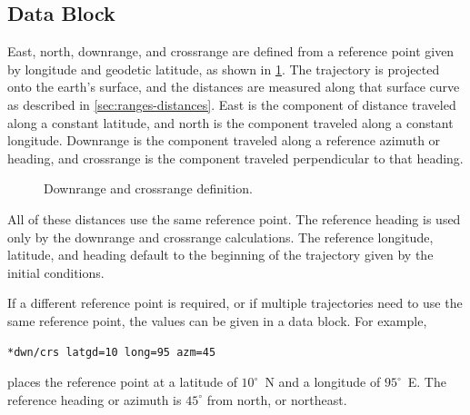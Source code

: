 \subsection{ Data Block}\label{sec:block-dwn-crs}

East, north, downrange, and crossrange are defined from a reference point given by
longitude and geodetic latitude, as shown in
\cref{fig:downrange-crossrange-definition}. The trajectory is projected onto the
earth's surface, and the distances are measured along that surface curve as described
in \cref{sec:ranges-distances}. East is the component of distance traveled along a
constant latitude, and north is the component traveled along a constant longitude.
Downrange is the component traveled along a reference azimuth or heading, and
crossrange is the component traveled perpendicular to that heading.

\begin{figure}[htbp]
  \centering
  
  \caption{Downrange and crossrange definition.}
  \label{fig:downrange-crossrange-definition}
\end{figure}

All of these distances use the same reference point. The reference heading is used
only by the downrange and crossrange calculations. The reference longitude,
latitude, and heading default to the beginning of the trajectory given by the initial
conditions.

If a different reference point is required, or if multiple trajectories need to use the
same reference point, the values can be given in a  data
block. For example,

\begin{lstlisting}[style=taosmanual]
*dwn/crs latgd=10 long=95 azm=45
\end{lstlisting}

places the reference point at a latitude of $10^\circ$~N and a longitude of
$95^\circ$~E. The reference heading or azimuth is $45^\circ$ from north, or
northeast.
